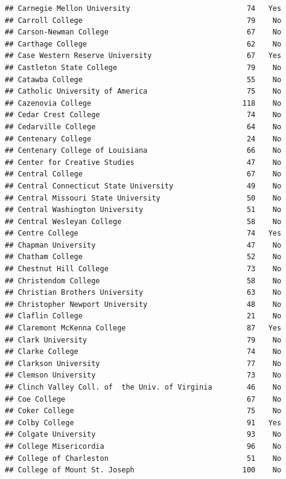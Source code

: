 \documentclass[
]{article}
\begin{document}
\begin{verbatim}
## Carnegie Mellon University                           74   Yes
## Carroll College                                      79    No
## Carson-Newman College                                67    No
## Carthage College                                     62    No
## Case Western Reserve University                      67   Yes
## Castleton State College                              79    No
## Catawba College                                      55    No
## Catholic University of America                       75    No
## Cazenovia College                                   118    No
## Cedar Crest College                                  74    No
## Cedarville College                                   64    No
## Centenary College                                    24    No
## Centenary College of Louisiana                       66    No
## Center for Creative Studies                          47    No
## Central College                                      67    No
## Central Connecticut State University                 49    No
## Central Missouri State University                    50    No
## Central Washington University                        51    No
## Central Wesleyan College                             58    No
## Centre College                                       74   Yes
## Chapman University                                   47    No
## Chatham College                                      52    No
## Chestnut Hill College                                73    No
## Christendom College                                  58    No
## Christian Brothers University                        63    No
## Christopher Newport University                       48    No
## Claflin College                                      21    No
## Claremont McKenna College                            87   Yes
## Clark University                                     79    No
## Clarke College                                       74    No
## Clarkson University                                  77    No
## Clemson University                                   73    No
## Clinch Valley Coll. of  the Univ. of Virginia        46    No
## Coe College                                          67    No
## Coker College                                        75    No
## Colby College                                        91   Yes
## Colgate University                                   93    No
## College Misericordia                                 96    No
## College of Charleston                                51    No
## College of Mount St. Joseph                         100    No

\end{verbatim}
\end{document}
